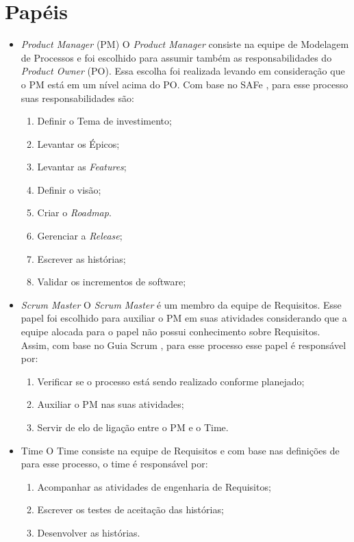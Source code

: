 \section{Papéis}

\begin{itemize}
  \item \textit{Product Manager} (PM)
 \subitem O \textit{Product Manager} consiste na equipe de Modelagem de Processos e foi escolhido
 para assumir também as responsabilidades do \textit{Product Owner} (PO). Essa escolha foi realizada
 levando em consideração que o PM está em um nível acima do PO. Com base no SAFe \cite{safe}, para
 esse processo suas responsabilidades são: \\
  \begin{enumerate}
    \item Definir o Tema de investimento;
    \item Levantar os Épicos;
    \item Levantar as \textit{Features};
    \item Definir o visão; 
    \item Criar o \textit{Roadmap}.
    \item Gerenciar a \textit{Release}; 
    \item Escrever as histórias;
    \item Validar os incrementos de software;
  \end{enumerate}
      
  \item \textit{Scrum Master}
 \subitem O  \textit{Scrum Master} é um membro da equipe de Requisitos. Esse papel foi escolhido
 para auxiliar o PM em suas atividades considerando que a equipe alocada para o papel não possui
 conhecimento sobre Requisitos. Assim, com base no Guia Scrum \cite{scrum}, para
 esse processo esse papel é responsável por: \\
    \begin{enumerate}
     \item Verificar se o processo está sendo realizado conforme planejado;
     \item Auxiliar o PM nas suas atividades; 
     \item Servir de elo de ligação entre o PM e o Time. 
    \end{enumerate}

  \item Time
 \subitem O  Time consiste na equipe de Requisitos e com base nas definições de 
 para esse processo, o time é responsável por: \\
    \begin{enumerate}
      \item Acompanhar as atividades de engenharia de Requisitos;
      \item Escrever os testes de aceitação das histórias;
      \item Desenvolver as histórias. 
    \end{enumerate}
      
\end{itemize}
